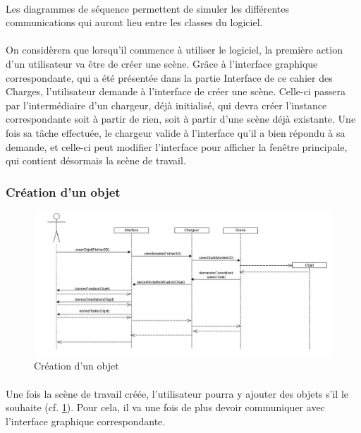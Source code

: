 \paragraph{}
Les diagrammes de séquence permettent de simuler les différentes communications qui auront lieu entre les classes du logiciel.

\paragraph{}
On considèrera que lorsqu’il commence à utiliser le logiciel, la première action d’un utilisateur va être de créer une scène. Grâce à l’interface graphique correspondante, qui a été présentée dans la partie Interface de ce cahier des Charges, l’utilisateur demande à l’interface de créer une scène. Celle-ci passera par l’intermédiaire d’un chargeur, déjà initialisé, qui devra créer l’instance correspondante soit à partir de rien, soit à partir d’une scène déjà existante.
    	Une fois sa tâche effectuée, le chargeur valide à l’interface qu’il a bien répondu à sa demande, et celle-ci peut modifier l’interface pour afficher la fenêtre principale, qui contient désormais la scène de travail.

\subsubsection{Création d'un objet}

\begin{figure}[h]
		\centering
		\includegraphics[scale=0.4]{creerobjet.jpg}
		\caption{\label{fig:creerObjet} Création d'un objet}
\end{figure}

\paragraph{}
Une fois la scène de travail créée, l'utilisateur pourra y ajouter des objets s'il le souhaite (cf. \ref{fig:creerObjet}). Pour cela, il va une fois de plus devoir communiquer avec l'interface graphique correspondante.

